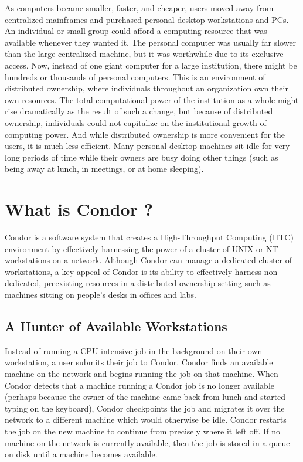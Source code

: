 As computers became smaller, faster, and cheaper, users moved
away from centralized mainframes and purchased personal desktop
workstations and PCs. An individual or small group could afford a
computing resource that was available whenever they wanted it. The
personal computer was
usually far slower than the large centralized machine, but it
was worthwhile due to its
exclusive access.
Now, instead of one giant
computer for a large institution, there might be hundreds or thousands
of personal computers. This is an environment of distributed ownership,
where individuals throughout an organization own their own resources.
The total computational power of the institution as a whole might rise
dramatically as the result of such a change, but because of distributed
ownership, individuals could not capitalize on the institutional growth of
computing power. And while distributed ownership is more convenient for
the users, it is much less efficient. Many personal desktop
machines sit idle for very long periods of time while their owners are
busy doing other things (such as being away at lunch, in meetings,
or at home sleeping). 

\section{\label{sec:what-is-condor}What is Condor ?}

Condor is a software system that creates a High-Throughput Computing
(HTC) environment by effectively harnessing the power of a cluster of
UNIX or NT workstations on a network. Although Condor can manage a
dedicated cluster of workstations, a key appeal of Condor is its
ability to effectively harness non-dedicated, preexisting resources in
a distributed ownership 
setting such as machines sitting on people's desks
in offices and labs. 

\subsection{A Hunter of Available Workstations}

Instead of running a CPU-intensive job in the background on their own
workstation, a user submits their job to Condor. Condor finds an
available machine on the network and begins running the job on
that machine. When Condor detects that a machine running a Condor job
is no longer available (perhaps because the owner of the machine
came back from lunch and started typing on the keyboard), Condor
checkpoints 
the job and migrates 
it over the network to a
different machine which would otherwise be idle. Condor restarts
the job on the new machine to continue from precisely where it left off.
If no
machine on the network is currently available, then the job is stored in
a queue on disk until a machine becomes available.

